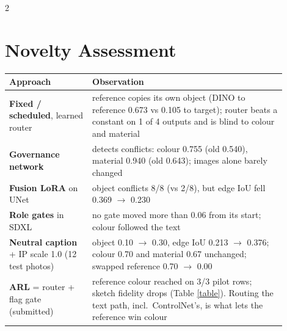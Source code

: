 \documentclass[a1,portrait]{a0poster}
\begin{document}
\begin{minipage}[c]{\linewidth}
\begin{framed}
\begin{multicols}{2}
\section*{Novelty Assessment}
\begin{center}
\small
\renewcommand{\arraystretch}{1.2}
\begin{tabular}{|p{0.27\linewidth}|p{0.63\linewidth}|}
\hline
\textbf{Approach} & \textbf{Observation}\\
\hline
\textbf{Fixed / scheduled}, learned router & reference copies its own object (DINO to reference 0.673 vs 0.105 to target); router beats a constant on 1 of 4 outputs and is blind to colour and material\\
\hline
\textbf{Governance network} & detects conflicts: colour 0.755 (old 0.540), material 0.940 (old 0.643); images alone barely changed\\
\hline
\textbf{Fusion LoRA} on UNet & object conflicts 8/8 (vs 2/8), but edge IoU fell 0.369 $\rightarrow$ 0.230\\
\hline
\textbf{Role gates} in SDXL & no gate moved more than 0.06 from its start; colour followed the text\\
\hline
\textbf{Neutral caption} + IP scale 1.0 (12 test photos) & object 0.10 $\rightarrow$ 0.30, edge IoU 0.213 $\rightarrow$ 0.376; colour 0.70 and material 0.67 unchanged; swapped reference 0.70 $\rightarrow$ 0.00\\
\hline
\textbf{ARL} = router + flag gate (submitted) & reference colour reached on 3/3 pilot rows; sketch fidelity drops (Table \ref{table}). Routing the text path, incl.\ ControlNet's, is what lets the reference win colour\\
\hline
\end{tabular}
\end{center}

\color{Black}

\end{multicols}
\end{framed}
\end{minipage}
\end{document}
